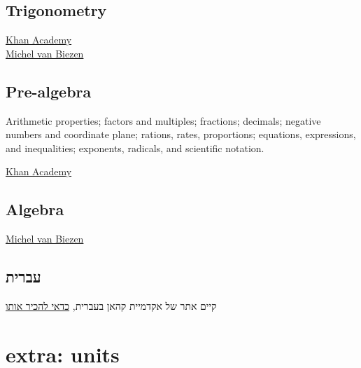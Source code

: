 \documentclass[
  letterpaper,
  DIV=11,
  numbers=noendperiod]{scrreprt}
\begin{document}
\section*{Trigonometry}\label{trigonometry}


\href{https://www.khanacademy.org/math/trigonometry}{Khan Academy}\\
\href{http://www.ilectureonline.com/lectures/subject/MATH/16}{Michel van
Biezen}

\section*{Pre-algebra}\label{pre-algebra}


Arithmetic properties; factors and multiples; fractions; decimals;
negative numbers and coordinate plane; rations, rates, proportions;
equations, expressions, and inequalities; exponents, radicals, and
scientific notation.

\href{https://www.khanacademy.org/math/pre-algebra}{Khan Academy}

\section*{Algebra}\label{algebra}


\href{http://www.ilectureonline.com/lectures/subject/MATH/14}{Michel van
Biezen}

\section*{עברית}\label{ux5e2ux5d1ux5e8ux5d9ux5ea}


קיים אתר של אקדמיית קהאן בעברית, \href{http://www.hebrewkhan.org/}{כדאי
להכיר אותו}

\chapter*{extra: units}\label{extra-units}

\end{document}

